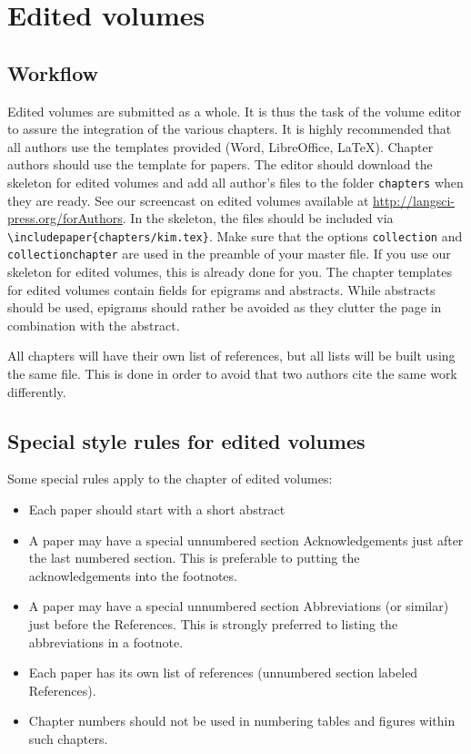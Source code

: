 \chapter{Edited volumes}
\section{Workflow}

Edited volumes are submitted as a whole. It is thus the task of the volume editor to assure the integration of the various chapters. It is highly recommended that all authors use the templates provided (Word, LibreOffice, \LaTeX). 
Chapter authors should use the template for papers. The editor should download the skeleton for edited volumes and add all author's files to the folder \verb+chapters+ when they are ready. See our screencast on edited volumes available at \url{http://langsci-press.org/forAuthors}. In the skeleton, the files should be included via \verb+\includepaper{chapters/kim.tex}+. Make sure that the options \verb+collection+ and \verb+collectionchapter+ are used in the preamble of your master file. If you use our skeleton for edited volumes, this is already done for you. 
The chapter templates for edited volumes contain fields for epigrams and abstracts. While abstracts should be used, epigrams should rather be avoided as they clutter the page in combination with the abstract. 

All chapters will have their own list of references, but all lists will be built using the same {\bibtex} file. This is done in order to avoid that two authors cite the same work differently. 
     
\section{Special style rules for edited volumes}
Some special rules apply to the chapter of edited volumes:
\begin{itemize}
\item Each paper should start with a short abstract
\item A paper may have a special unnumbered section Acknowledgements just after the last numbered section. This is preferable to putting the acknowledgements into the footnotes.
\item A paper may have a special unnumbered section Abbreviations (or similar) just before the References. This is strongly preferred to listing the abbreviations in a footnote.
\item Each paper has its own list of references (unnumbered section labeled References).
\item Chapter numbers should not be used in numbering tables and figures within such chapters.
\end{itemize}